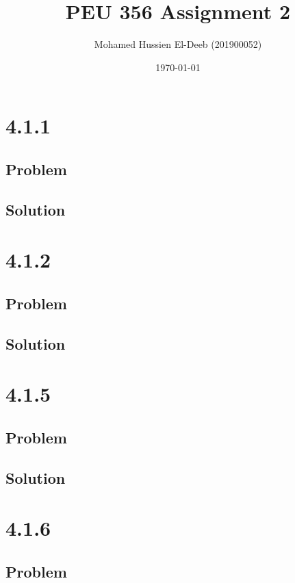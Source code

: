 \documentclass[12pt]{article}
\title{PEU 356 Assignment 2}
\author{Mohamed Hussien El-Deeb (201900052)}
\date{\today}
\begin{document}
\maketitle
\tableofcontents

\section{4.1.1}

\subsection{Problem}

\subsection{Solution}

\section{4.1.2}

\subsection{Problem}

\subsection{Solution}

\section{4.1.5}

\subsection{Problem}

\subsection{Solution}

\section{4.1.6}

\subsection{Problem}
\end{document}
